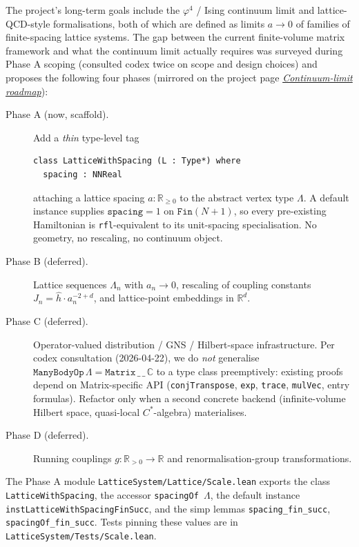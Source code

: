\documentclass[a4paper,11pt]{article}
\begin{document}
The project's long-term goals include the $\varphi^4$ / Ising
continuum limit and lattice-QCD-style formalisations, both of which
are defined as limits $a \to 0$ of families of finite-spacing lattice
systems. The gap between the current finite-volume matrix framework
and what the continuum limit actually requires was surveyed during
Phase A scoping (consulted codex twice on scope and design choices)
and proposes the following four phases (mirrored on the project
page \href{https://phasetr.github.io/lattice-system/\#continuum-limit-roadmap}%
{\textsl{Continuum-limit roadmap}}):

\begin{description}
\item[Phase A (now, scaffold).] Add a \emph{thin} type-level tag
\begin{verbatim}
class LatticeWithSpacing (L : Type*) where
  spacing : NNReal
\end{verbatim}
attaching a lattice spacing $a : \mathbb{R}_{\geq 0}$ to the abstract
vertex type $\Lambda$. A default instance supplies
$\texttt{spacing} = 1$ on $\texttt{Fin}(N+1)$, so every pre-existing
Hamiltonian is \texttt{rfl}-equivalent to its unit-spacing
specialisation. No geometry, no rescaling, no continuum object.
\item[Phase B (deferred).] Lattice sequences $\Lambda_n$ with
$a_n \to 0$, rescaling of coupling constants
$J_n = \hat h \cdot a_n^{-2+d}$, and lattice-point embeddings in
$\mathbb{R}^d$.
\item[Phase C (deferred).] Operator-valued distribution / GNS /
Hilbert-space infrastructure. Per codex consultation (2026-04-22),
we do \emph{not} generalise
$\texttt{ManyBodyOp}\,\Lambda = \texttt{Matrix}\,\_\,\_\,\mathbb{C}$
to a type class preemptively: existing proofs depend on
Matrix-specific API (\texttt{conjTranspose}, \texttt{exp},
\texttt{trace}, \texttt{mulVec}, entry formulas). Refactor only when
a second concrete backend (infinite-volume Hilbert space, quasi-local
$C^*$-algebra) materialises.
\item[Phase D (deferred).] Running couplings $g : \mathbb{R}_{>0} \to
\mathbb{R}$ and renormalisation-group transformations.
\end{description}

The Phase A module \texttt{LatticeSystem/Lattice/Scale.lean} exports
the class \texttt{LatticeWithSpacing}, the accessor
\texttt{spacingOf\,}$\Lambda$, the default instance
\texttt{instLatticeWithSpacingFinSucc}, and the simp lemmas
\texttt{spacing\_fin\_succ}, \texttt{spacingOf\_fin\_succ}. Tests
pinning these values are in \texttt{LatticeSystem/Tests/Scale.lean}.
\end{document}
